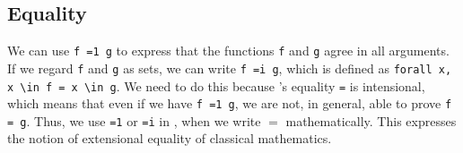 \subsection{Equality}
We can use \lstinline{f =1 g} to express that the functions \lstinline{f} and \lstinline{g} agree in all arguments.
If we regard \lstinline{f} and \lstinline{g} as sets, we can write \lstinline{f =i g}, which is defined as \lstinline{forall x, x \in f = x \in g}.
We need to do this because \coq's equality \lstinline{=} is intensional, which means that even if we have \lstinline{f =1 g}, we are not, in general, able to prove \lstinline{f = g}.
Thus, we use \lstinline{=1} or \lstinline{=i} in \coq, when we write $=$ mathematically. 
This expresses the notion of extensional equality of classical mathematics. 



